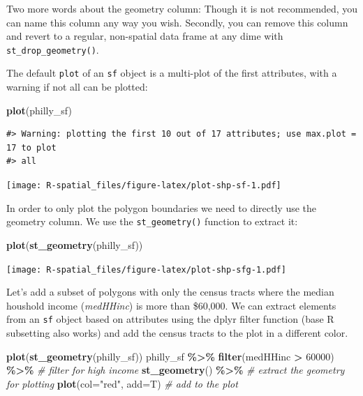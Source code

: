 \documentclass[
]{book}
\newenvironment{Shaded}{\begin{snugshade}}{\end{snugshade}}
\newcommand{\AttributeTok}[1]{\textcolor[rgb]{0.13,0.29,0.53}{#1}}
\newcommand{\CommentTok}[1]{\textcolor[rgb]{0.56,0.35,0.01}{\textit{#1}}}
\newcommand{\DecValTok}[1]{\textcolor[rgb]{0.00,0.00,0.81}{#1}}
\newcommand{\FunctionTok}[1]{\textcolor[rgb]{0.13,0.29,0.53}{\textbf{#1}}}
\newcommand{\NormalTok}[1]{#1}
\newcommand{\SpecialCharTok}[1]{\textcolor[rgb]{0.81,0.36,0.00}{\textbf{#1}}}
\newcommand{\StringTok}[1]{\textcolor[rgb]{0.31,0.60,0.02}{#1}}
\begin{document}
Two more words about the geometry column: Though it is not recommended, you can name this column any way you wish. Secondly, you can remove this column and revert to a regular, non-spatial data frame at any dime with \texttt{st\_drop\_geometry()}.

The default \texttt{plot} of an \texttt{sf} object is a multi-plot of the first attributes, with a warning if not all can be plotted:

\begin{Shaded}
\begin{Highlighting}[]
\FunctionTok{plot}\NormalTok{(philly\_sf)}
\end{Highlighting}
\end{Shaded}

\begin{verbatim}
#> Warning: plotting the first 10 out of 17 attributes; use max.plot = 17 to plot
#> all
\end{verbatim}

\texttt{[image: R-spatial\_files/figure-latex/plot-shp-sf-1.pdf]}

In order to only plot the polygon boundaries we need to directly use the geometry column. We use the \texttt{st\_geometry()} function to extract it:

\begin{Shaded}
\begin{Highlighting}[]
\FunctionTok{plot}\NormalTok{(}\FunctionTok{st\_geometry}\NormalTok{(philly\_sf))}
\end{Highlighting}
\end{Shaded}

\texttt{[image: R-spatial\_files/figure-latex/plot-shp-sfg-1.pdf]}

Let's add a subset of polygons with only the census tracts where the median houshold income (\emph{medHHinc}) is more than \$60,000. We can extract elements from an \texttt{sf} object based on attributes using the dplyr filter function (base R subsetting also works) and add the census tracts to the plot in a different color.

\begin{Shaded}
\begin{Highlighting}[]
\FunctionTok{plot}\NormalTok{(}\FunctionTok{st\_geometry}\NormalTok{(philly\_sf))}
\NormalTok{philly\_sf }\SpecialCharTok{\%\textgreater{}\%} 
  \FunctionTok{filter}\NormalTok{(medHHinc }\SpecialCharTok{\textgreater{}} \DecValTok{60000}\NormalTok{) }\SpecialCharTok{\%\textgreater{}\%} \CommentTok{\# filter for high income}
  \FunctionTok{st\_geometry}\NormalTok{() }\SpecialCharTok{\%\textgreater{}\%} \CommentTok{\# extract the geometry for plotting}
  \FunctionTok{plot}\NormalTok{(}\AttributeTok{col=}\StringTok{"red"}\NormalTok{, }\AttributeTok{add=}\NormalTok{T) }\CommentTok{\# add to the plot}
\end{Highlighting}
\end{Shaded}
\end{document}
